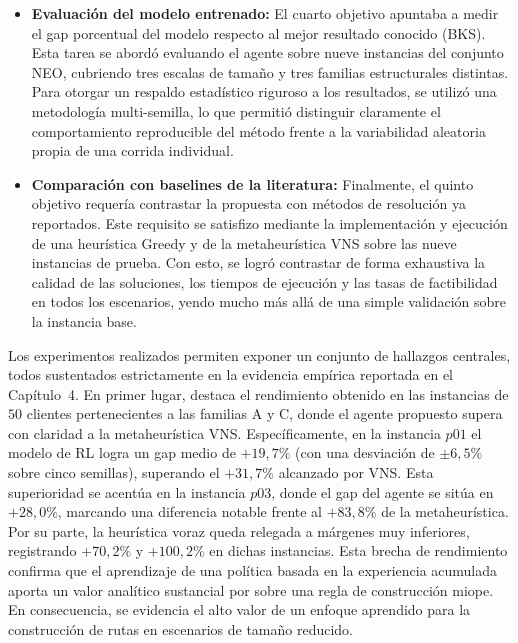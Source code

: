 \begin{itemize}
    \item \textbf{Evaluación del modelo entrenado:} El cuarto objetivo apuntaba a medir el gap porcentual del modelo respecto al mejor resultado conocido (BKS). Esta tarea se abordó evaluando el agente sobre nueve instancias del conjunto NEO, cubriendo tres escalas de tamaño y tres familias estructurales distintas. Para otorgar un respaldo estadístico riguroso a los resultados, se utilizó una metodología multi-semilla, lo que permitió distinguir claramente el comportamiento reproducible del método frente a la variabilidad aleatoria propia de una corrida individual.
    
    \item \textbf{Comparación con baselines de la literatura:} Finalmente, el quinto objetivo requería contrastar la propuesta con métodos de resolución ya reportados. Este requisito se satisfizo mediante la implementación y ejecución de una heurística Greedy y de la metaheurística VNS sobre las nueve instancias de prueba. Con esto, se logró contrastar de forma exhaustiva la calidad de las soluciones, los tiempos de ejecución y las tasas de factibilidad en todos los escenarios, yendo mucho más allá de una simple validación sobre la instancia base.
\end{itemize}

Los experimentos realizados permiten exponer un conjunto de hallazgos centrales, todos sustentados estrictamente en la evidencia empírica reportada en el Capítulo~4. En primer lugar, destaca el rendimiento obtenido en las instancias de $50$ clientes pertenecientes a las familias A y C, donde el agente propuesto supera con claridad a la metaheurística VNS. Específicamente, en la instancia $p01$ el modelo de RL logra un gap medio de $+19{,}7\%$ (con una desviación de $\pm 6{,}5\%$ sobre cinco semillas), superando el $+31{,}7\%$ alcanzado por VNS. Esta superioridad se acentúa en la instancia $p03$, donde el gap del agente se sitúa en $+28{,}0\%$, marcando una diferencia notable frente al $+83{,}8\%$ de la metaheurística. Por su parte, la heurística voraz queda relegada a márgenes muy inferiores, registrando $+70{,}2\%$ y $+100{,}2\%$ en dichas instancias. Esta brecha de rendimiento confirma que el aprendizaje de una política basada en la experiencia acumulada aporta un valor analítico sustancial por sobre una regla de construcción miope. En consecuencia, se evidencia el alto valor de un enfoque aprendido para la construcción de rutas en escenarios de tamaño reducido.

